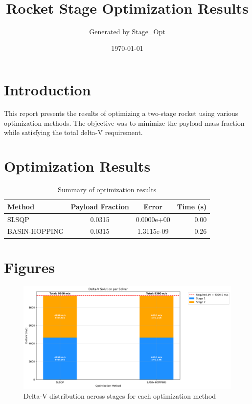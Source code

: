 \documentclass{article}
\title{Rocket Stage Optimization Results}
\author{Generated by Stage\_Opt}
\date{\today}
\begin{document}
\maketitle

\section{Introduction}
This report presents the results of optimizing a two-stage rocket using various optimization methods. The objective was to minimize the payload mass fraction while satisfying the total delta-V requirement.

\section{Optimization Results}
\begin{table}[H]
\centering
\begin{tabular}{lccr}
\toprule
Method & Payload Fraction & Error & Time (s) \\
\midrule
SLSQP & 0.0315 & 0.0000e+00 & 0.00 \\
BASIN-HOPPING & 0.0315 & 1.3115e-09 & 0.26 \\
\bottomrule
\end{tabular}
\caption{Summary of optimization results}
\label{tab:results}
\end{table}

\section{Figures}
\begin{figure}[H]
\centering
\includegraphics[width=\textwidth]{dv_breakdown.png}
\caption{Delta-V distribution across stages for each optimization method}
\label{fig:dv-breakdown}
\end{figure}
\end{document}
